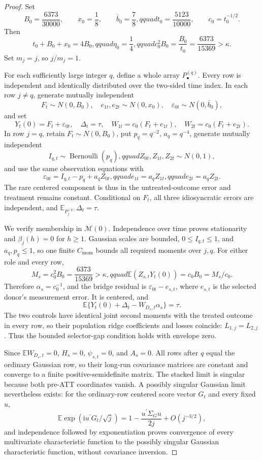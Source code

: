 \documentclass{article}
\begin{document}
\begin{proof}
Set
\[
 B_0=\frac{6373}{30000},\qquad x_0=\frac18,
 \qquad \bar b_0=\frac78,qquad t_0=\frac{5123}{10000},
 \qquad c_0=t_0^{-1/2}.
\]
Then
\[
 t_0+B_0+x_0=4B_0,qquad \eta_0=\frac14,qquad
 c_0^2B_0=\frac{B_0}{t_0}=\frac{6373}{15369}>\kappa.
\]
Set \(m_j=j\), so \(j/m_j=1\).

For each sufficiently large integer \(q\), define a whole array \(P_\bullet^{(q)}\).  Every row is independent and identically distributed over the two-sided time index.  In each row \(j\ne q\), generate mutually independent
\[
 F_t\sim N(0,B_0),\quad e_{1t},e_{2t}\sim N(0,x_0),
 \quad \varepsilon_{0t}\sim N(0,\bar b_0),
\]
and set
\[
 Y_t(0)=F_t+\varepsilon_{0t},\quad \Delta_t=\tau,
 \quad W_{1t}=c_0(F_t+e_{1t}),\quad W_{2t}=c_0(F_t+e_{2t}).
\]
In row \(j=q\), retain \(F_t\sim N(0,B_0)\), put \(p_q=q^{-2}\), \(a_q=q^{-4}\), generate mutually independent
\[
 I_{q,t}\sim\operatorname{Bernoulli}(p_q),qquad
 Z_{0t},Z_{1t},Z_{2t}\sim N(0,1),
\]
and use the same observation equations with
\[
 \varepsilon_{0t}=I_{q,t}-p_q+a_qZ_{0t},qquad
 e_{1t}=a_qZ_{1t},qquad e_{2t}=a_qZ_{2t}.
\]
The rare centered component is thus in the untreated-outcome error and treatment remains constant.  Conditional on \(F_t\), all three idiosyncratic errors are independent, and \(\mathbb E_{P_j^{(q)}}\Delta_t=\tau\).

We verify membership in \(\mathcal M(0)\).  Independence over time proves stationarity and \(\beta_j(h)=0\) for \(h\geq1\).  Gaussian scales are bounded, \(0\leq I_{q,t}\leq1\), and \(a_q,p_q\leq1\), so one finite \(C_{\mathrm{mom}}\) bounds all required moments over \(j,q\).  For either role and every row,
\[
 M_s=c_0^2B_0=\frac{6373}{15369}>\kappa,qquad
 \mathbb E(Z_{s,t}Y_t(0))=c_0B_0=M_s/c_0.
\]
Therefore \(\alpha_s=c_0^{-1}\), and the bridge residual is \(\varepsilon_{0t}-e_{s,t}\), where \(e_{s,t}\) is the selected donor's measurement error.  It is centered, and
\[
 \mathbb E\{Y_t(0)+\Delta_t-W_{D_s,t}\alpha_s\}=\tau.
\]
The two controls have identical joint second moments with the treated outcome in every row, so their population ridge coefficients and losses coincide: \(L_{1,j}=L_{2,j}\).  Thus the bounded selector-gap condition holds with envelope zero.

Since \(\mathbb EW_{D_s,t}=0\), \(H_s=0\), \(\psi_{s,t}=0\), and \(A_s=0\).  All rows after \(q\) equal the ordinary Gaussian row, so their long-run covariance matrices are constant and converge to a finite positive-semidefinite matrix.  The stacked limit is singular because both pre-ATT coordinates vanish.  A possibly singular Gaussian limit nevertheless exists: for the ordinary-row centered score vector \(G_t\) and every fixed \(u\),
\[
 \mathbb E\exp(\mathrm iu^{\prime}G_t/\sqrt j)
 =1-\frac{u^{\prime}\Sigma_Gu}{2j}+O(j^{-3/2}),
\]
and independence followed by exponentiation proves convergence of every multivariate characteristic function to the possibly singular Gaussian characteristic function, without covariance inversion.


\end{proof}
\end{document}
